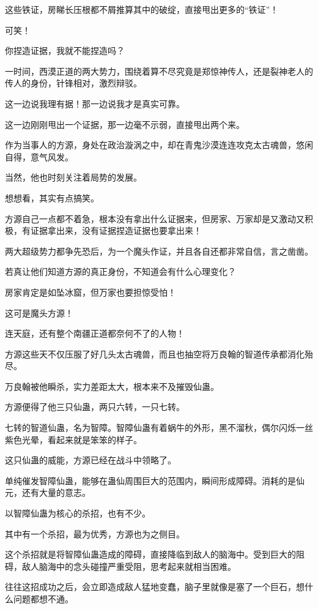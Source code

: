 \begin{this_body}
这些铁证，房睇长压根都不屑推算其中的破绽，直接甩出更多的“铁证”！

可笑！

你捏造证据，我就不能捏造吗？

一时间，西漠正道的两大势力，围绕着算不尽究竟是郑惊神传人，还是裂神老人的传人的身份，针锋相对，激烈辩驳。

这一边说我理有据！那一边说我才是真实可靠。

这一边刚刚甩出一个证据，那一边毫不示弱，直接甩出两个来。

作为当事人的方源，身处在政治漩涡之中，却在青鬼沙漠连连攻克太古魂兽，悠闲自得，意气风发。

当然，他也时刻关注着局势的发展。

想想看，其实有点搞笑。

方源自己一点都不着急，根本没有拿出什么证据来，但房家、万家却是又激动又积极，有证据拿出来，没有证据捏造证据也要拿出来！

两大超级势力都争先恐后，为一个魔头作证，并且各自还都非常自信，言之凿凿。

若真让他们知道方源的真正身份，不知道会有什么心理变化？

房家肯定是如坠冰窟，但万家也要担惊受怕！

这可是魔头方源！

连天庭，还有整个南疆正道都奈何不了的人物！

方源这些天不仅压服了好几头太古魂兽，而且也抽空将万良翰的智道传承都消化殆尽。

万良翰被他瞬杀，实力差距太大，根本来不及摧毁仙蛊。

方源便得了他三只仙蛊，两只六转，一只七转。

七转的智道仙蛊，名为智障。智障仙蛊有着蜗牛的外形，黑不溜秋，偶尔闪烁一丝紫色光晕，看起来就是笨笨的样子。

这只仙蛊的威能，方源已经在战斗中领略了。

单纯催发智障仙蛊，能够在蛊仙周围巨大的范围内，瞬间形成障碍。消耗的是仙元，还有大量的意志。

以智障仙蛊为核心的杀招，也有不少。

其中有一个杀招，最为优秀，方源也为之侧目。

这个杀招就是将智障仙蛊造成的障碍，直接降临到敌人的脑海中。受到巨大的阻碍，敌人脑海中的念头碰撞严重受阻，思考起来就相当困难。

往往这招成功之后，会立即造成敌人猛地变蠢，脑子里就像是塞了一个巨石，想什么问题都想不通。


\end{this_body}
